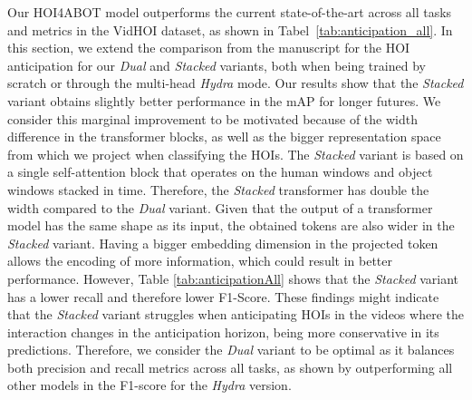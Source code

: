 \documentclass{article}
\begin{document}
Our HOI4ABOT model outperforms the current state-of-the-art across all tasks and metrics in the VidHOI dataset, as shown in Tabel~\ref{tab:anticipation_all}. In this section, we extend the comparison from the manuscript for the HOI anticipation for our \textit{Dual} and \textit{Stacked} variants, both when being trained by scratch or through the multi-head \textit{Hydra} mode. Our results show that the \textit{Stacked} variant obtains slightly better performance in the mAP for longer futures. We consider this marginal improvement to be motivated because of the width difference in the transformer blocks, as well as the bigger representation space from which we project when classifying the HOIs. The \textit{Stacked} variant is based on a single self-attention block that operates on the human windows and object windows stacked in time. Therefore, the \textit{Stacked} transformer has double the width compared to the \textit{Dual} variant. Given that the output of a transformer model has the same shape as its input, the obtained tokens are also wider in the \textit{Stacked} variant. Having a bigger embedding dimension in the projected token allows the encoding of more information, which could result in better performance. However, Table \ref{tab:anticipationAll} shows that the \textit{Stacked} variant has a lower recall and therefore lower F1-Score. These findings might indicate that the \textit{Stacked} variant struggles when anticipating HOIs in the videos where the interaction changes in the anticipation horizon, being more conservative in its predictions. Therefore, we consider the \textit{Dual} variant to be optimal as it balances both precision and recall metrics across all tasks, as shown by outperforming all other models in the F1-score for the \textit{Hydra} version.
\end{document}
